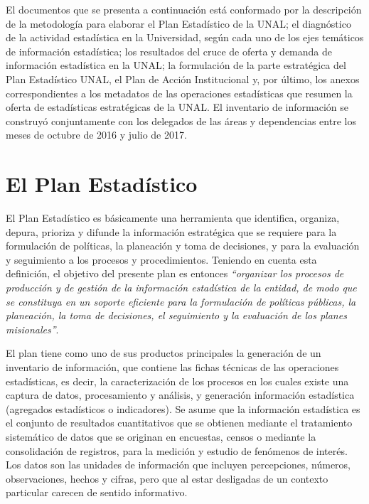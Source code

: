 \documentclass[
]{book}
\begin{document}
El documentos que se presenta a continuación está conformado por la descripción de la metodología para elaborar el Plan Estadístico de la UNAL; el diagnóstico de la actividad estadística en la Universidad, según cada uno de los ejes temáticos de información estadística; los resultados del cruce de oferta y demanda de información estadística en la UNAL; la formulación de la parte estratégica del Plan Estadístico UNAL, el Plan de Acción Institucional y, por último, los anexos correspondientes a los metadatos de las operaciones estadísticas que resumen la oferta de estadísticas estratégicas de la UNAL. El inventario de información se construyó conjuntamente con los delegados de las áreas y dependencias entre los meses de octubre de 2016 y julio de 2017.

\hypertarget{el-plan-estaduxedstico}{%
\chapter{El Plan Estadístico}\label{el-plan-estaduxedstico}}

El Plan Estadístico es básicamente una herramienta que identifica, organiza, depura, prioriza y difunde la información estratégica que se requiere para la formulación de políticas, la planeación y
toma de decisiones, y para la evaluación y seguimiento a los procesos y procedimientos. Teniendo
en cuenta esta definición, el objetivo del presente plan es entonces \emph{``organizar los procesos de producción y de gestión de la información estadística de la entidad, de modo que se constituya en un soporte eficiente para la formulación de políticas públicas, la planeación, la toma de decisiones, el seguimiento y la evaluación de los planes misionales''}.

El plan tiene como uno de sus productos principales la generación de un inventario de
información, que contiene las fichas técnicas de las operaciones estadísticas, es decir, la
caracterización de los procesos en los cuales existe una captura de datos, procesamiento y análisis,
y generación información estadística (agregados estadísticos o indicadores). Se asume que la
información estadística es el conjunto de resultados cuantitativos que se obtienen mediante el
tratamiento sistemático de datos que se originan en encuestas, censos o mediante la
consolidación de registros, para la medición y estudio de fenómenos de interés. Los datos son las
unidades de información que incluyen percepciones, números, observaciones, hechos y cifras,
pero que al estar desligadas de un contexto particular carecen de sentido informativo.
\end{document}
